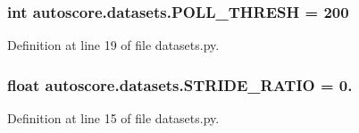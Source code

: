 \subsubsection[{\texorpdfstring{P\+O\+L\+L\+\_\+\+T\+H\+R\+E\+SH}{POLL_THRESH}}]{\setlength{\rightskip}{0pt plus 5cm}int autoscore.\+datasets.\+P\+O\+L\+L\+\_\+\+T\+H\+R\+E\+SH = 200}\hypertarget{namespaceautoscore_1_1datasets_ae50cb083b87b74755b2e1cd980a87521}{}\label{namespaceautoscore_1_1datasets_ae50cb083b87b74755b2e1cd980a87521}


Definition at line 19 of file datasets.\+py.

\subsubsection[{\texorpdfstring{S\+T\+R\+I\+D\+E\+\_\+\+R\+A\+T\+IO}{STRIDE_RATIO}}]{\setlength{\rightskip}{0pt plus 5cm}float autoscore.\+datasets.\+S\+T\+R\+I\+D\+E\+\_\+\+R\+A\+T\+IO = 0.}\hypertarget{namespaceautoscore_1_1datasets_a8dd1080a927de57cd4216f41d3c8dfa5}{}\label{namespaceautoscore_1_1datasets_a8dd1080a927de57cd4216f41d3c8dfa5}


Definition at line 15 of file datasets.\+py.

